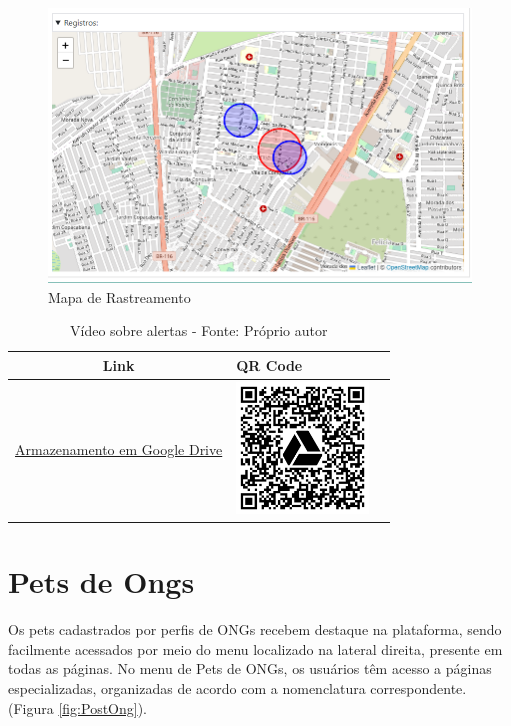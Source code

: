 \begin{figure}[htb]
     \centering
     \includegraphics[width=14cm]{arquivos/Figuras/image10.png}
     \caption{Mapa de Rastreamento}
         \label{fig:MapaRastreamento}
\end{figure}

\begin{table}[htbp]
\centering
\renewcommand{\arraystretch}{1.5}
\begin{tabular}{|c|>{\centering\arraybackslash}m{6cm}|c|}
\hline
\textbf{Link} & \textbf{QR Code} \\
\hline
\href{https://drive.google.com/file/d/1WKvfjzqN_9fP20qKuA3kI_nFvi4fcJis/view?usp=drive_link}{Armazenamento em Google Drive} & \includegraphics[width=3.5cm]{arquivos/ImgLinks/alertas.png} \\
\hline
\end{tabular}
\caption*{Vídeo sobre alertas - Fonte: Próprio autor}
\end{table}

\newpage
\section{Pets de Ongs}

Os pets cadastrados por perfis de ONGs recebem destaque na plataforma, sendo facilmente acessados por meio do menu localizado na lateral direita, presente em todas as páginas. No menu de Pets de ONGs, os usuários têm acesso a páginas especializadas, organizadas de acordo com a nomenclatura correspondente. (Figura \ref{fig:PostOng}).

